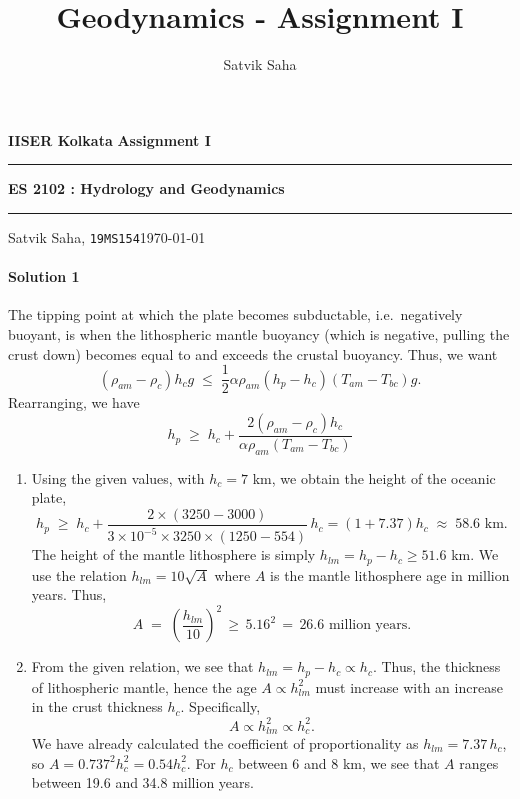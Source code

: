 \documentclass[10pt]{article}
\title{Geodynamics - Assignment I}
\author{Satvik Saha}
\date{}
\begin{document}
        \noindent\textbf{IISER Kolkata} \hfill \textbf{Assignment I}
        \vspace{3pt}
        \hrule
        \vspace{3pt}
        \begin{center}
                \LARGE{\textbf{ES 2102 : Hydrology and Geodynamics}}
        \end{center}
        \vspace{3pt}
        \hrule
        \vspace{3pt}
        Satvik Saha, \texttt{19MS154}\hfill\today
        \vspace{20pt}

        \paragraph{Solution 1} The tipping point at which the plate becomes subductable, i.e.\ negatively buoyant, is when the
        lithospheric mantle buoyancy (which is negative, pulling the crust down) becomes equal to and exceeds the crustal buoyancy. Thus, we want
        \[
                (\rho_{am} - \rho_c)h_c g \;\leq\; \frac{1}{2}\alpha\rho_{am}(h_p - h_c)(T_{am} - T_{bc})g.
        \]
        Rearranging, we have
        \[
                h_p \;\geq\; h_c + \frac{2(\rho_{am} - \rho_c)h_c}{\alpha\rho_{am}(T_{am} - T_{bc})}
        \]
        \begin{enumerate}
                \item Using the given values, with $h_c = 7$ km, we obtain the height of the oceanic plate,
                \[
                        h_p \;\geq\; h_c + \frac{2\times(3250 - 3000)}{3\times 10^{-5}\times 3250 \times (1250 - 554)}\,h_c = (1 + 7.37) h_c
                                \;\approx\; 58.6 \text{ km}.
                \]
                The height of the mantle lithosphere is simply $h_{lm} = h_p - h_c \geq 51.6$ km. We use the relation $h_{lm} = 10\sqrt{A}$
                where $A$ is the mantle lithosphere age in million years. Thus,
                \[
                        A \;=\; \left(\frac{h_{lm}}{10}\right)^2 \,\geq\, 5.16^2 \,=\, 26.6\text{ million years}.
                \]
                \item From the given relation, we see that $h_{lm} = h_p - h_c \propto h_c$. Thus, the thickness of lithospheric mantle, hence
                the age $A \propto h_{lm}^2$ must increase with an increase in the crust thickness $h_c$. Specifically,
                \[
                        A \propto h_{lm}^2 \propto h_c^2.
                \]
                We have already calculated the coefficient of proportionality as $h_{lm} = 7.37\, h_c$, so $A = 0.737^2 h_c^2 = 0.54 h_c^2$.
                For $h_c$ between $6$ and $8$ km, we see that $A$ ranges between 19.6 and 34.8 million years.
        \end{enumerate}
\end{document}
